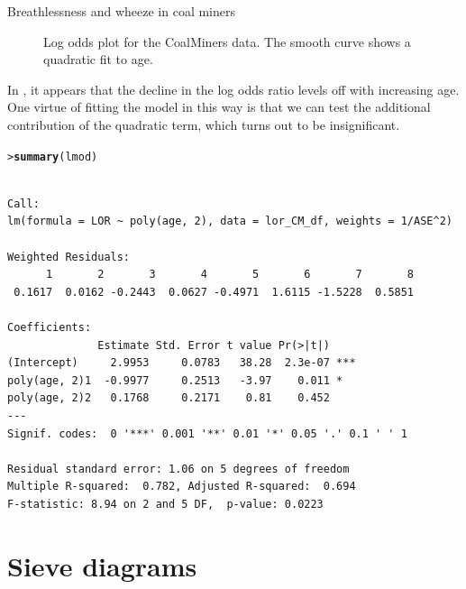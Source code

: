 \documentclass[10pt,krantz2]{krantz}\usepackage[]{graphicx}\usepackage[]{color}
\makeatletter
\newcommand{\hlstd}[1]{\textcolor[rgb]{0.345,0.345,0.345}{#1}}%
\newcommand{\hlkwd}[1]{\textcolor[rgb]{0.737,0.353,0.396}{\textbf{#1}}}%
\newenvironment{kframe}{%
 \def\at@end@of@kframe{}%
 \ifinner\ifhmode%
  \def\at@end@of@kframe{\end{minipage}}%
  \begin{minipage}{\columnwidth}%
 \fi\fi%
 \def\FrameCommand##1{\hskip\@totalleftmargin \hskip-\fboxsep
 \colorbox{shadecolor}{##1}\hskip-\fboxsep
     \hskip-\linewidth \hskip-\@totalleftmargin \hskip\columnwidth}%
 \MakeFramed {\advance\hsize-\width
   \@totalleftmargin\z@ \linewidth\hsize
   \@setminipage}}%
 {\par\unskip\endMakeFramed%
 \at@end@of@kframe}
\newenvironment{knitrout}{}{} %
\renewenvironment{knitrout}{\small\renewcommand{\baselinestretch}{.85}}{} %
\makeatother
\begin{document}
\begin{Example}[wheeze1]{Breathlessness and wheeze in coal miners}
\begin{knitrout}
\begin{figure}[!htbp]
\caption[Log odds plot for the CoalMiners data]{Log odds plot for the CoalMiners data.  The smooth curve shows a quadratic fit to age.}\label{fig:coalminer3}
\end{figure}


\end{knitrout}
In , it appears that the decline in the
log odds ratio levels off with increasing age.  One virtue of
fitting the model in this way is that we can test the additional contribution
of the quadratic term, which turns out to be insignificant.
\begin{knitrout}
\color{fgcolor}\begin{kframe}
\begin{alltt}
\hlstd{> }\hlkwd{summary}\hlstd{(lmod)}
\end{alltt}
\begin{verbatim}

Call:
lm(formula = LOR ~ poly(age, 2), data = lor_CM_df, weights = 1/ASE^2)

Weighted Residuals:
      1       2       3       4       5       6       7       8 
 0.1617  0.0162 -0.2443  0.0627 -0.4971  1.6115 -1.5228  0.5851 

Coefficients:
              Estimate Std. Error t value Pr(>|t|)    
(Intercept)     2.9953     0.0783   38.28  2.3e-07 ***
poly(age, 2)1  -0.9977     0.2513   -3.97    0.011 *  
poly(age, 2)2   0.1768     0.2171    0.81    0.452    
---
Signif. codes:  0 '***' 0.001 '**' 0.01 '*' 0.05 '.' 0.1 ' ' 1

Residual standard error: 1.06 on 5 degrees of freedom
Multiple R-squared:  0.782,	Adjusted R-squared:  0.694 
F-statistic: 8.94 on 2 and 5 DF,  p-value: 0.0223
\end{verbatim}
\end{kframe}
\end{knitrout}

\end{Example}

\section{Sieve diagrams}\label{sec:twoway-sieve}
\end{document}
